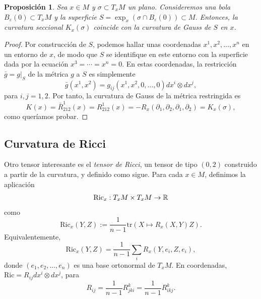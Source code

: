 \documentclass[11pt,a4paper]{amsbook}
\newtheorem{prop}[subsection]{Proposición}
\theoremstyle{remark} \newtheorem{rmk}[subsection]{Observación}
\theoremstyle{definition} \newtheorem{defn}[subsection]{Definición}
\theoremstyle{definition} \newtheorem{ex}[subsection]{Ejemplo}
\theoremstyle{definition} \newtheorem{ej}[subsection]{Ejercicio}
\begin{document}
\begin{prop}
Sea $x\in M$ y $\sigma \subset T_xM$ un plano. Consideremos una bola $B_{\varepsilon}(0)\subset T_xM$ y la superficie $S=\exp_x(\sigma \cap B_{\varepsilon}(0)) \subset M$. Entonces, la curvatura seccional $K_x(\sigma)$ coincide con la curvatura de Gauss de $S$ en $x$.
\end{prop}

\begin{proof}
Por construcción de $S$, podemos hallar unas coordenadas $x^1,x^2,\dots,x^n$ en un entorno de $x$, de modo que $S$ se identifique en este entorno con la superficie dada por la ecuación $x^3=\cdots=x^n =0$. En estas coordenadas, la restricción $\bar{g}=g|_S$ de la métrica $g$ a $S$ es simplemente \[\bar{g}(x^1,x^2)=g_{ij}(x^1,x^2,0,\dots,0) dx^i\otimes dx^j, \]
para $i,j=1,2$. Por tanto, la curvatura de Gauss de la métrica restringida es
\begin{equation*}
K(x)=\bar{R}^{1}_{212} (x) = R^1_{212}(x) = -R_x(\partial_1,\partial_2,\partial_1,\partial_2) = K_x(\sigma),
\end{equation*}
como queríamos probar.
\end{proof}

\subsection{Curvatura de Ricci} Otro tensor interesante es el \emph{tensor de Ricci}, un tensor de tipo $(0,2)$ construido a partir de la curvatura, y definido como sigue. Para cada $x\in M$, definimos la aplicación
\begin{equation*}
\mathrm{Ric}_x: T_xM \times T_xM \rightarrow \mathbb R
\end{equation*}
como
\begin{equation*}
\mathrm{Ric}_x(Y,Z) := \frac{1}{n-1} \mathrm{tr}(X\mapsto R_x(X,Y)Z).
\end{equation*}
Equivalentemente,
\begin{equation*}
\mathrm{Ric}_x(Y,Z) = \frac{1}{n-1} \sum_i R_x(Y,e_i,Z,e_i),
\end{equation*}
donde $(e_1,e_2,\dots,e_n)$ es una base ortonormal de $T_xM$. En coordenadas, $\mathrm{Ric}=R_{ij} dx^i\otimes dx^j$, para
\begin{equation*}
R_{ij} = \frac{1}{n-1} R^{k}_{jki} = \frac{1}{n-1} R^k_{ikj}.
\end{equation*}
\end{document}
